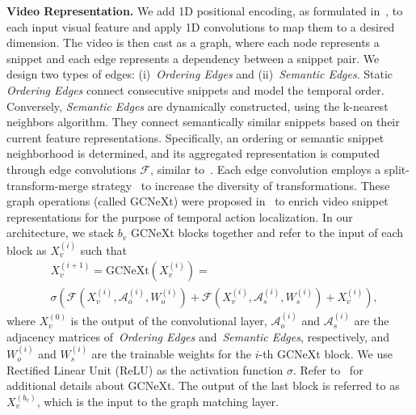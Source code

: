 \documentclass[10pt,twocolumn,letterpaper]{article}
\newcommand{\F}{\mathcal{F}}
\begin{document}
\noindent\textbf{Video Representation.} We add 1D positional encoding, as formulated in~\cite{devlin2018bert}, to each input visual feature and apply 1D convolutions to map them to a desired dimension.
The video is then cast as a graph, where each node represents a snippet and each edge represents a dependency between a snippet pair. We design two types of edges: (i)~\textit{Ordering Edges} and (ii)~\textit{Semantic Edges}. Static \textit{Ordering Edges} connect consecutive snippets and model the temporal order. Conversely, \textit{Semantic Edges} are dynamically constructed, using the k-nearest neighbors algorithm. They connect semantically similar snippets based on their current feature representations. Specifically, an ordering or semantic snippet neighborhood is determined, and its aggregated representation is computed through edge convolutions $\F$, similar to~\cite{wang2018dynamic}. Each edge convolution employs a split-transform-merge strategy~\cite{xie2017aggregated} to increase the diversity of transformations. These graph operations (called GCNeXt) were proposed in~\cite{Xu_2020_CVPR} to enrich video snippet representations for the purpose of temporal action localization. In our architecture, we stack $b_v$ GCNeXt blocks together and refer to the input of each block as $X_v^{(i)}$ such that
\begin{align} \label{eq:gcnext}
   &X_v^{(i+1)}=\text{GCNeXt}(X_v^{(i)})= \\\nonumber
   &\sigma\left(\F{(X_v^{(i)},\mathcal{A}_o^{(i)},W_o^{(i)})}+\F{(X_v^{(i)},\mathcal{A}_s^{(i)},W_s^{(i)})}+X_v^{(i)} \right), 
\end{align}
where $X_v^{(0)}$ is the output of the convolutional layer, $\mathcal{A}_o^{(i)}$  and $\mathcal{A}_s^{(i)}$ are the adjacency matrices of~\textit{Ordering Edges} and~\textit{Semantic Edges}, respectively, and $W_{o}^{(i)}$ and $W_{s}^{(i)}$ are the trainable weights for the $i$-th GCNeXt block. 
We use Rectified Linear Unit (ReLU) as the activation function $\sigma$. Refer to~\cite{Xu_2020_CVPR} for additional details about GCNeXt. The output of the last block is referred to as $X_v^{(b_v)}$, which is the input to the graph matching layer. 
\end{document}
